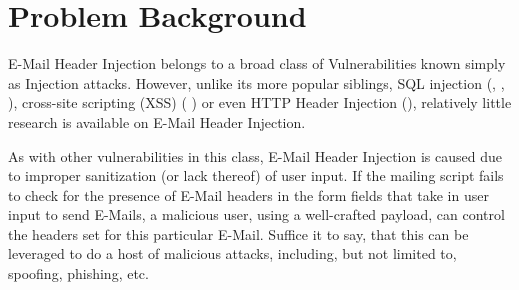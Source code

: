 \section{Problem Background}

E-Mail Header Injection belongs to a broad class of Vulnerabilities known simply as Injection attacks. However, unlike its more popular siblings, SQL injection (\cite{sql0}, \cite{sql1}, \cite{sql2}), cross-site scripting (XSS) (\cite{Injection1} \cite{KleinAmit}) or even HTTP Header Injection (\cite{sessionride}), relatively little research is available on E-Mail Header Injection.

As with other vulnerabilities in this class, E-Mail Header Injection is caused due to improper sanitization (or lack thereof) of user input. If the mailing script fails to check for the presence of E-Mail headers in the form fields that take in user input to send E-Mails, a malicious user, using a well-crafted payload, can control the headers set for this particular E-Mail. Suffice it to say, that this can be leveraged to do a host of malicious attacks, including, but not limited to, spoofing, phishing, etc.